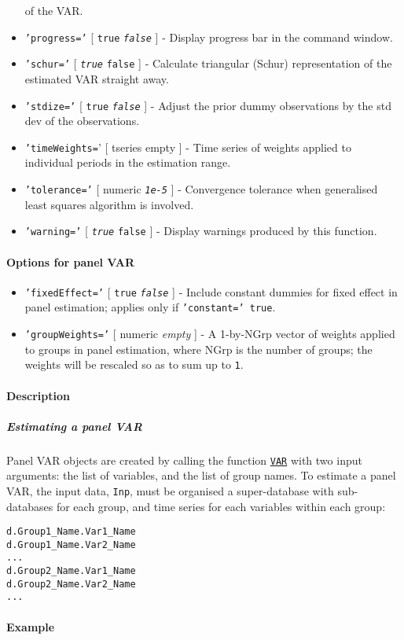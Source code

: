 \begin{itemize}
  of the VAR.
\item
  \texttt{'progress='} {[} \texttt{true} \textbar{}
  \emph{\texttt{false}} {]} - Display progress bar in the command
  window.
\item
  \texttt{'schur='} {[} \emph{\texttt{true}} \textbar{} \texttt{false}
  {]} - Calculate triangular (Schur) representation of the estimated VAR
  straight away.
\item
  \texttt{'stdize='} {[} \texttt{true} \textbar{} \emph{\texttt{false}}
  {]} - Adjust the prior dummy observations by the std dev of the
  observations.
\item
  \texttt{'timeWeights=}' {[} tseries \textbar{} empty {]} - Time series
  of weights applied to individual periods in the estimation range.
\item
  \texttt{'tolerance='} {[} numeric \textbar{} \emph{\texttt{1e-5}} {]}
  - Convergence tolerance when generalised least squares algorithm is
  involved.
\item
  \texttt{'warning='} {[} \emph{\texttt{true}} \textbar{} \texttt{false}
  {]} - Display warnings produced by this function.
\end{itemize}

\paragraph{Options for panel VAR}\label{options-for-panel-var}

\begin{itemize}
\item
  \texttt{'fixedEffect='} {[} \texttt{true} \textbar{}
  \emph{\texttt{false}} {]} - Include constant dummies for fixed effect
  in panel estimation; applies only if \texttt{'constant=' true}.
\item
  \texttt{'groupWeights='} {[} numeric \textbar{} \emph{empty} {]} - A
  1-by-NGrp vector of weights applied to groups in panel estimation,
  where NGrp is the number of groups; the weights will be rescaled so as
  to sum up to \texttt{1}.
\end{itemize}

\paragraph{Description}\label{description}

\subparagraph{Estimating a panel VAR}\label{estimating-a-panel-var}

Panel VAR objects are created by calling the function
\href{VAR/VAR}{\texttt{VAR}} with two input arguments: the list of
variables, and the list of group names. To estimate a panel VAR, the
input data, \texttt{Inp}, must be organised a super-database with
sub-databases for each group, and time series for each variables within
each group:

\begin{verbatim}
d.Group1_Name.Var1_Name
d.Group1_Name.Var2_Name
...
d.Group2_Name.Var1_Name
d.Group2_Name.Var2_Name
...
\end{verbatim}

\paragraph{Example}\label{example}


